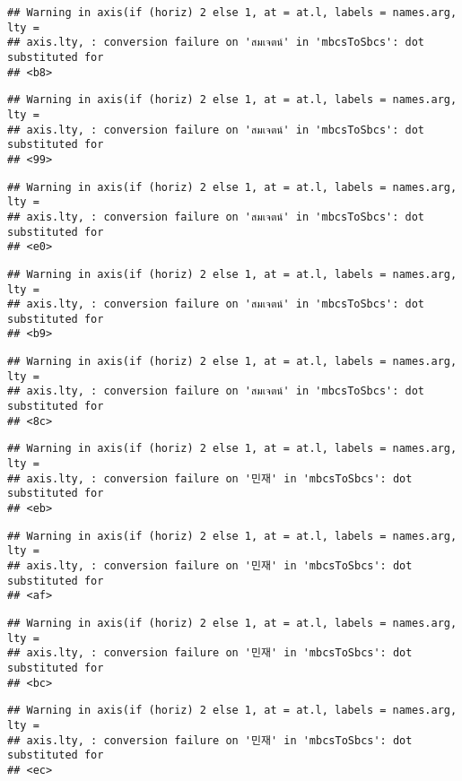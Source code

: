 \documentclass[
]{article}
\begin{document}
\begin{verbatim}
## Warning in axis(if (horiz) 2 else 1, at = at.l, labels = names.arg, lty =
## axis.lty, : conversion failure on 'สมเจตน์' in 'mbcsToSbcs': dot substituted for
## <b8>
\end{verbatim}

\begin{verbatim}
## Warning in axis(if (horiz) 2 else 1, at = at.l, labels = names.arg, lty =
## axis.lty, : conversion failure on 'สมเจตน์' in 'mbcsToSbcs': dot substituted for
## <99>
\end{verbatim}

\begin{verbatim}
## Warning in axis(if (horiz) 2 else 1, at = at.l, labels = names.arg, lty =
## axis.lty, : conversion failure on 'สมเจตน์' in 'mbcsToSbcs': dot substituted for
## <e0>
\end{verbatim}

\begin{verbatim}
## Warning in axis(if (horiz) 2 else 1, at = at.l, labels = names.arg, lty =
## axis.lty, : conversion failure on 'สมเจตน์' in 'mbcsToSbcs': dot substituted for
## <b9>
\end{verbatim}

\begin{verbatim}
## Warning in axis(if (horiz) 2 else 1, at = at.l, labels = names.arg, lty =
## axis.lty, : conversion failure on 'สมเจตน์' in 'mbcsToSbcs': dot substituted for
## <8c>
\end{verbatim}

\begin{verbatim}
## Warning in axis(if (horiz) 2 else 1, at = at.l, labels = names.arg, lty =
## axis.lty, : conversion failure on '민재' in 'mbcsToSbcs': dot substituted for
## <eb>
\end{verbatim}

\begin{verbatim}
## Warning in axis(if (horiz) 2 else 1, at = at.l, labels = names.arg, lty =
## axis.lty, : conversion failure on '민재' in 'mbcsToSbcs': dot substituted for
## <af>
\end{verbatim}

\begin{verbatim}
## Warning in axis(if (horiz) 2 else 1, at = at.l, labels = names.arg, lty =
## axis.lty, : conversion failure on '민재' in 'mbcsToSbcs': dot substituted for
## <bc>
\end{verbatim}

\begin{verbatim}
## Warning in axis(if (horiz) 2 else 1, at = at.l, labels = names.arg, lty =
## axis.lty, : conversion failure on '민재' in 'mbcsToSbcs': dot substituted for
## <ec>
\end{verbatim}
\end{document}

